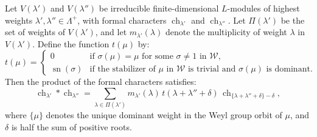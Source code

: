 Let $V(\lambda')$ and $V(\lambda'')$ be irreducible finite-dimensional $L$-modules of highest weights $\lambda', \lambda'' \in \Lambda^+$, with formal characters $\operatorname{ch}_{\lambda'}$ and $\operatorname{ch}_{\lambda''}$. Let $\Pi(\lambda')$ be the set of weights of $V(\lambda')$, and let $m_{\lambda'}(\lambda)$ denote the multiplicity of weight $\lambda$ in $V(\lambda')$. Define the function $t(\mu)$ by:
$$
t(\mu) =
\begin{cases}
0 & \text{if } \sigma(\mu) = \mu \text{ for some } \sigma \neq 1 \text{ in } \mathcal{W}, \\
\operatorname{sn}(\sigma) & \text{if the stabilizer of } \mu \text{ in } \mathcal{W} \text{ is trivial and } \sigma(\mu) \text{ is dominant}.
\end{cases}
$$
Then the product of the formal characters satisfies:
$$
\operatorname{ch}_{\lambda'} * \operatorname{ch}_{\lambda''} = \sum_{\lambda \in \Pi(\lambda')} m_{\lambda'}(\lambda) \, t(\lambda + \lambda'' + \delta) \, \operatorname{ch}_{\{\lambda + \lambda'' + \delta\} - \delta},
$$
where $\{\mu\}$ denotes the unique dominant weight in the Weyl group orbit of $\mu$, and $\delta$ is half the sum of positive roots.

